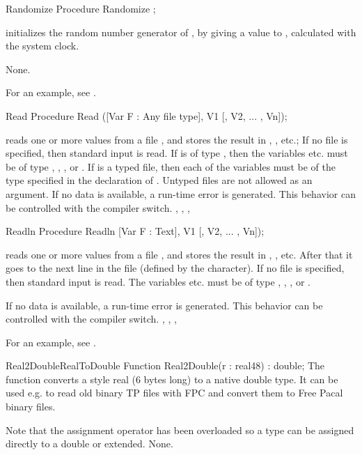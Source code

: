 \begin{procedure}{Randomize}
\Declaration
Procedure Randomize ;

\Description
{} initializes the random number generator of \fpc, by giving
a value to , calculated with the system clock.

\Errors
None.
\SeeAlso
{}
\end{procedure}
For an example, see .
\begin{procedure}{Read}
\Declaration
Procedure Read ([Var F : Any file type], V1 [, V2, ... , Vn]);

\Description
{} reads one or more values from a file , and stores the
result in , , etc.; If no file  is specified, then
standard input is read.
If  is of type , then the variables  etc. must be
of type , , ,  or .
If  is a typed file, then each of the variables must be of the type
specified in the declaration of . Untyped files are not allowed as an
argument.
\Errors
If no data is available, a run-time error is generated. This behavior can
be controlled with the  compiler switch.
\SeeAlso
{}, , , 
\end{procedure}


\begin{procedure}{Readln}
\Declaration
Procedure Readln [Var F : Text], V1 [, V2, ... , Vn]);

\Description
{} reads one or more values from a file , and stores the
result in , , etc. After that it goes to the next line in
the file (defined by the  character).
If no file  is specified, then standard input is read.
The variables  etc. must be of type , ,
,  or .

\Errors
If no data is available, a run-time error is generated. This behavior can
be controlled with the  compiler switch.
\SeeAlso
{}, , , 
\end{procedure}

For an example, see .

\begin{functionl}{Real2Double}{RealToDouble}
\Declaration
Function Real2Double(r : real48) : double;
\Description
The  function converts a \tp style real (6 bytes long) to
a native \fpc double type. It can be used e.g. to read old binary TP files with
FPC and convert them to Free Pacal binary files.

Note that the assignment operator has been overloaded so a  type
can be assigned directly to a double or extended.
\Errors
None.
\SeeAlso
\end{functionl}

